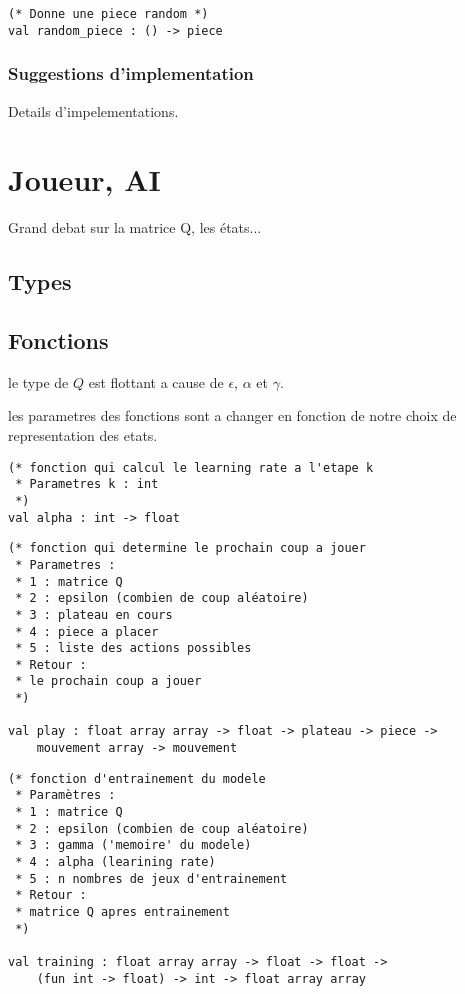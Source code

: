 \documentclass{article}
\begin{document}
\begin{lstlisting}[frame=L]
(* Donne une piece random *)
val random_piece : () -> piece
\end{lstlisting}

\subsubsection{Suggestions d'implementation}

Details d'impelementations.

\section{Joueur, AI}

Grand debat sur la matrice Q, les états...

\subsection{Types}

\subsection{Fonctions}

\danger{} le type de \( Q \) est flottant a cause de \( \epsilon \), \( \alpha \) et \( \gamma \).

\noindent
\danger{} les parametres des fonctions sont a changer en fonction de notre
choix de representation des etats.

\begin{lstlisting}[frame=L]
(* fonction qui calcul le learning rate a l'etape k
 * Parametres k : int
 *)
val alpha : int -> float
\end{lstlisting}


\begin{lstlisting}[frame=L]
(* fonction qui determine le prochain coup a jouer
 * Parametres :
 * 1 : matrice Q
 * 2 : epsilon (combien de coup aléatoire)
 * 3 : plateau en cours
 * 4 : piece a placer
 * 5 : liste des actions possibles
 * Retour :
 * le prochain coup a jouer
 *)

val play : float array array -> float -> plateau -> piece ->
	mouvement array -> mouvement
\end{lstlisting}

\begin{lstlisting}[frame=L]
(* fonction d'entrainement du modele
 * Paramètres :
 * 1 : matrice Q
 * 2 : epsilon (combien de coup aléatoire)
 * 3 : gamma ('memoire' du modele)
 * 4 : alpha (learining rate)
 * 5 : n nombres de jeux d'entrainement
 * Retour :
 * matrice Q apres entrainement
 *)

val training : float array array -> float -> float ->
	(fun int -> float) -> int -> float array array
\end{lstlisting}
\end{document}
